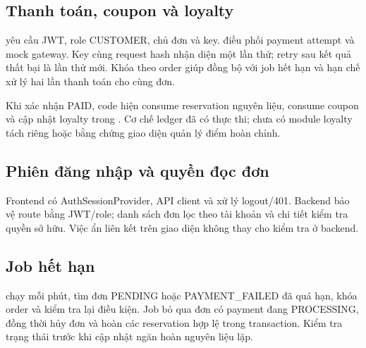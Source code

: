 \subsection{Thanh toán, coupon và loyalty}
 yêu cầu JWT, role CUSTOMER, chủ đơn và key.
 điều phối payment attempt và mock gateway. Key
cùng request hash nhận diện một lần thử; retry sau kết quả thất bại là
lần thử mới. Khóa theo order giúp đồng bộ với job hết hạn và hạn chế xử
lý hai lần thanh toán cho cùng đơn.

Khi xác nhận PAID, code hiện consume reservation nguyên liệu, consume
coupon và cập nhật loyalty trong .
Cơ chế ledger đã có thực thi; chưa có module loyalty tách riêng hoặc
bằng chứng giao diện quản lý điểm hoàn chỉnh.

\subsection{Phiên đăng nhập và quyền đọc đơn}
Frontend có AuthSessionProvider, API client và xử lý logout/401. Backend
bảo vệ route bằng JWT/role; danh sách đơn lọc theo tài khoản và chi tiết
kiểm tra quyền sở hữu. Việc ẩn liên kết trên giao diện không thay cho
kiểm tra ở backend.

\subsection{Job hết hạn}
 chạy mỗi phút, tìm đơn PENDING hoặc PAYMENT\_FAILED
đã quá hạn, khóa order và kiểm tra lại điều kiện. Job bỏ qua đơn có
payment đang PROCESSING, đồng thời hủy đơn và hoàn các reservation hợp
lệ trong transaction. Kiểm tra trạng thái trước khi cập nhật ngăn hoàn
nguyên liệu lặp.

